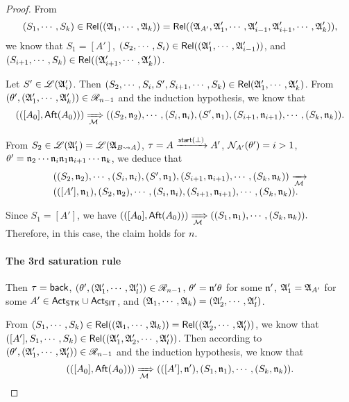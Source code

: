 \begin{proof}
From 
%
$$(S_1, \cdots, S_k) \in \mathsf{Rel}(({\mathfrak{A} }_1, \cdots, {\mathfrak{A} }_k)) = \mathsf{Rel}(({\mathfrak{A} }_{A'}, {\mathfrak{A} }'_1, \cdots, {\mathfrak{A} }'_{i-1}, {\mathfrak{A} }'_{i+1}, \cdots, {\mathfrak{A} }'_k)),$$ 
%
we know that $S_1 = [A']$, $(S_2, \cdots, S_i) \in \mathsf{Rel}(({\mathfrak{A} }'_1, \cdots, {\mathfrak{A} }'_{i-1}))$, and $(S_{i+1}, \cdots, S_k) \in \mathsf{Rel}(({\mathfrak{A} }'_{i+1}, \cdots, {\mathfrak{A} }'_k))$. 

Let $S' \in {\mathscr{L} }({\mathfrak{A} }'_i)$. Then $(S_2, \cdots, S_i, S', S_{i+1}, \cdots, S_k) \in \mathsf{Rel}({\mathfrak{A} }'_1, \cdots, {\mathfrak{A} }'_k)$.
From $(\theta', ({\mathfrak{A} }'_1, \cdots, {\mathfrak{A} }'_k)) \in \mathscr{R}_{n-1}$ and the induction hypothesis, we know that  
%
$$(([A_0], {\sf Aft}(A_0))) \xRightarrow[{\mathcal{M} }]{} ((S_2, \mathfrak{n}_2), \cdots, (S_i, \mathfrak{n}_i), (S', \mathfrak{n}_1), (S_{i+1}, \mathfrak{n}_{i+1}), \cdots, (S_k, \mathfrak{n}_k)).$$ 

From $S_2 \in {\mathscr{L} }({\mathfrak{A} }'_1) = {\mathscr{L} }({\mathfrak{A} }_{B\rightsquigarrow A})$,  $\tau = A \xrightarrow{{\mathsf{start} }(\bot)} A'$, $\mathcal{N}_{A'}(\theta') = i > 1$, 
$\theta' = \mathfrak{n}_2  \cdots  \mathfrak{n}_{i} \mathfrak{n}_1  \mathfrak{n}_{i+1}  \cdots  \mathfrak{n}_k$, we deduce that 
$$
\begin{array}{l}
((S_2, \mathfrak{n}_2), \cdots, (S_i, \mathfrak{n}_i), (S', \mathfrak{n}_1), (S_{i+1}, \mathfrak{n}_{i+1}), \cdots, (S_k, \mathfrak{n}_k)) \xrightarrow[{\mathcal{M} }]{} \\
(([A'], \mathfrak{n}_1), (S_2, \mathfrak{n}_2), \cdots, (S_i, \mathfrak{n}_i), (S_{i+1}, \mathfrak{n}_{i+1}), \cdots, (S_k, \mathfrak{n}_k)).
\end{array}
$$ 

Since $S_1 = [A']$, we have
$(([A_0], {\sf Aft}(A_0))) \xRightarrow[{\mathcal{M} }]{} ((S_1, \mathfrak{n}_1), \cdots, (S_k, \mathfrak{n}_k)).$
%
Therefore, in this case, the claim holds for $n$.


\paragraph*{The 3rd saturation rule} Then $\tau = {\mathsf{back} }$, $(\theta', ({\mathfrak{A} }'_1, \cdots, {\mathfrak{A} }'_l)) \in \mathscr{R}_{n-1}$,  $\theta' = \mathfrak{n}' \theta$ for some $\mathfrak{n}'$, ${\mathfrak{A} }'_1 = {\mathfrak{A} }_{A'}$ for some $A' \in {\sf Act}_{\sf STK}\cup {\sf Act}_{\sf SIT}$, and $({\mathfrak{A} }_1, \cdots, {\mathfrak{A} }_k) = ({\mathfrak{A} }'_2, \cdots, {\mathfrak{A} }'_l)$.

From $(S_1, \cdots, S_k) \in \mathsf{Rel}(({\mathfrak{A} }_1, \cdots, {\mathfrak{A} }_k)) = \mathsf{Rel}(({\mathfrak{A} }'_2, \cdots, {\mathfrak{A} }'_l))$, we know that $([A'], S_1, \cdots, S_k) \in \mathsf{Rel}(({\mathfrak{A} }'_1, {\mathfrak{A} }'_2, \cdots, {\mathfrak{A} }'_l))$. 
Then according to $(\theta', ({\mathfrak{A} }'_1, \cdots, {\mathfrak{A} }'_l)) \in \mathscr{R}_{n-1}$ and the induction hypothesis, we know that 
$$(([A_0], {\sf Aft}(A_0))) \xRightarrow[{\mathcal{M} }]{} (([A'], \mathfrak{n}'), (S_1, \mathfrak{n}_1), \cdots, (S_k, \mathfrak{n}_k)).$$ 


\end{proof}
